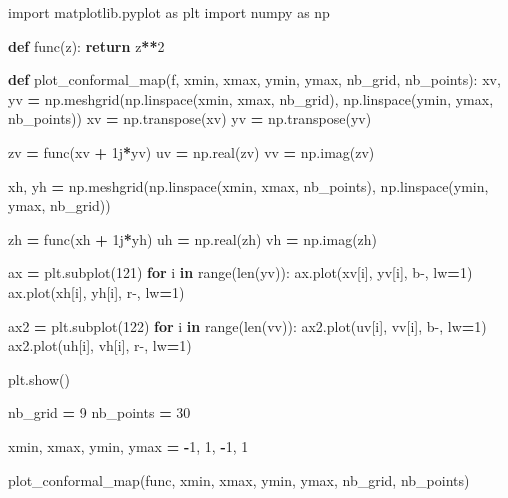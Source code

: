 \documentclass[
]{book}
\newenvironment{Shaded}{\begin{snugshade}}{\end{snugshade}}
\newcommand{\BuiltInTok}[1]{#1}
\newcommand{\ControlFlowTok}[1]{\textcolor[rgb]{0.13,0.29,0.53}{\textbf{#1}}}
\newcommand{\DecValTok}[1]{\textcolor[rgb]{0.00,0.00,0.81}{#1}}
\newcommand{\ImportTok}[1]{#1}
\newcommand{\KeywordTok}[1]{\textcolor[rgb]{0.13,0.29,0.53}{\textbf{#1}}}
\newcommand{\NormalTok}[1]{#1}
\newcommand{\OperatorTok}[1]{\textcolor[rgb]{0.81,0.36,0.00}{\textbf{#1}}}
\newcommand{\OtherTok}[1]{\textcolor[rgb]{0.56,0.35,0.01}{#1}}
\newcommand{\StringTok}[1]{\textcolor[rgb]{0.31,0.60,0.02}{#1}}
\theoremstyle{definition}
\theoremstyle{definition}
\theoremstyle{definition}
\theoremstyle{definition}
\theoremstyle{remark}
\begin{document}
\begin{Shaded}
\begin{Highlighting}[]
\ImportTok{import}\NormalTok{ matplotlib.pyplot }\ImportTok{as}\NormalTok{ plt}
\ImportTok{import}\NormalTok{ numpy }\ImportTok{as}\NormalTok{ np}

\KeywordTok{def}\NormalTok{ func(z):}
    \ControlFlowTok{return}\NormalTok{ z}\OperatorTok{**}\DecValTok{2}


\KeywordTok{def}\NormalTok{ plot\_conformal\_map(f, xmin, xmax, ymin, ymax, nb\_grid, nb\_points):}
\NormalTok{    xv, yv }\OperatorTok{=}\NormalTok{ np.meshgrid(np.linspace(xmin, xmax, nb\_grid), np.linspace(ymin, ymax, nb\_points))}
\NormalTok{    xv }\OperatorTok{=}\NormalTok{ np.transpose(xv)}
\NormalTok{    yv }\OperatorTok{=}\NormalTok{ np.transpose(yv)}

\NormalTok{    zv }\OperatorTok{=}\NormalTok{ func(xv }\OperatorTok{+} \OtherTok{1j}\OperatorTok{*}\NormalTok{yv)}
\NormalTok{    uv }\OperatorTok{=}\NormalTok{ np.real(zv)}
\NormalTok{    vv }\OperatorTok{=}\NormalTok{ np.imag(zv)}

\NormalTok{    xh, yh }\OperatorTok{=}\NormalTok{ np.meshgrid(np.linspace(xmin, xmax, nb\_points), np.linspace(ymin, ymax, nb\_grid))}

\NormalTok{    zh }\OperatorTok{=}\NormalTok{ func(xh }\OperatorTok{+} \OtherTok{1j}\OperatorTok{*}\NormalTok{yh)}
\NormalTok{    uh }\OperatorTok{=}\NormalTok{ np.real(zh)}
\NormalTok{    vh }\OperatorTok{=}\NormalTok{ np.imag(zh)}

\NormalTok{    ax }\OperatorTok{=}\NormalTok{ plt.subplot(}\DecValTok{121}\NormalTok{)}
    \ControlFlowTok{for}\NormalTok{ i }\KeywordTok{in} \BuiltInTok{range}\NormalTok{(}\BuiltInTok{len}\NormalTok{(yv)):}
\NormalTok{        ax.plot(xv[i], yv[i], }\StringTok{\textquotesingle{}b{-}\textquotesingle{}}\NormalTok{, lw}\OperatorTok{=}\DecValTok{1}\NormalTok{)}
\NormalTok{        ax.plot(xh[i], yh[i], }\StringTok{\textquotesingle{}r{-}\textquotesingle{}}\NormalTok{, lw}\OperatorTok{=}\DecValTok{1}\NormalTok{)}

\NormalTok{    ax2 }\OperatorTok{=}\NormalTok{ plt.subplot(}\DecValTok{122}\NormalTok{)}
    \ControlFlowTok{for}\NormalTok{ i }\KeywordTok{in} \BuiltInTok{range}\NormalTok{(}\BuiltInTok{len}\NormalTok{(vv)):}
\NormalTok{        ax2.plot(uv[i], vv[i], }\StringTok{\textquotesingle{}b{-}\textquotesingle{}}\NormalTok{, lw}\OperatorTok{=}\DecValTok{1}\NormalTok{)}
\NormalTok{        ax2.plot(uh[i], vh[i], }\StringTok{\textquotesingle{}r{-}\textquotesingle{}}\NormalTok{, lw}\OperatorTok{=}\DecValTok{1}\NormalTok{)}

\NormalTok{    plt.show()}


\NormalTok{nb\_grid }\OperatorTok{=} \DecValTok{9}
\NormalTok{nb\_points }\OperatorTok{=} \DecValTok{30}

\NormalTok{xmin, xmax, ymin, ymax }\OperatorTok{=} \OperatorTok{{-}}\DecValTok{1}\NormalTok{, }\DecValTok{1}\NormalTok{, }\OperatorTok{{-}}\DecValTok{1}\NormalTok{, }\DecValTok{1}

\NormalTok{plot\_conformal\_map(func, xmin, xmax, ymin, ymax, nb\_grid, nb\_points)}
\end{Highlighting}
\end{Shaded}
\end{document}
